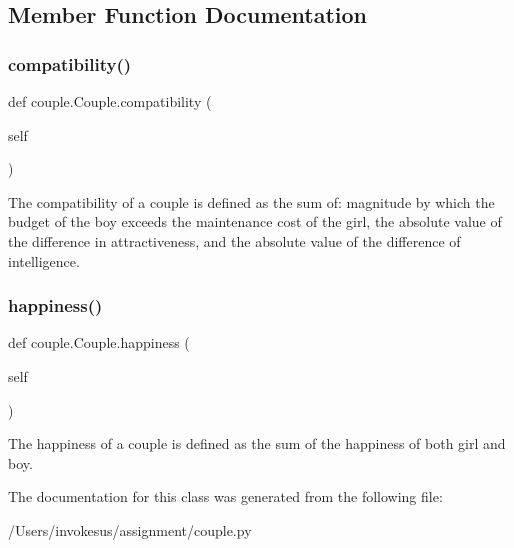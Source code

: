 \subsection{Member Function Documentation}
\mbox{\label{classcouple_1_1_couple_a1752d35bbc3da6524676374511693988}} 
\subsubsection{\texorpdfstring{compatibility()}{compatibility()}}
{\footnotesize\ttfamily def couple.\+Couple.\+compatibility (\begin{DoxyParamCaption}\item[{}]{self }\end{DoxyParamCaption})}

\begin{DoxyVerb}The compatibility of a couple is defined as the sum of: magnitude by which the budget of the boy exceeds the maintenance cost of the girl, the absolute value of the difference in attractiveness, and the absolute value of the difference of intelligence.\end{DoxyVerb}
 \mbox{\label{classcouple_1_1_couple_ab7ac98ab6a0dd03bf75790f949cb0c90}} 
\subsubsection{\texorpdfstring{happiness()}{happiness()}}
{\footnotesize\ttfamily def couple.\+Couple.\+happiness (\begin{DoxyParamCaption}\item[{}]{self }\end{DoxyParamCaption})}

\begin{DoxyVerb}The happiness of a couple is defined as the sum of the happiness of both girl and boy.
\end{DoxyVerb}
 

The documentation for this class was generated from the following file\+:\begin{DoxyCompactItemize}
\item 
/\+Users/invokesus/assignment/couple.\+py\end{DoxyCompactItemize}
